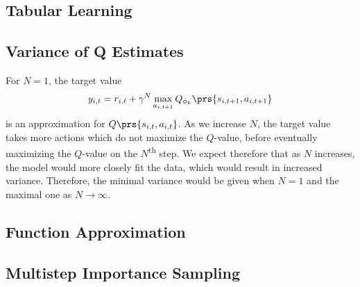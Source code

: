 \documentclass[10pt]{article}
\theoremstyle{definition}
\begin{document}
\subsection{Tabular Learning}

\subsection{Variance of Q Estimates}

For $N = 1$, the target value
\[y_{i,t} = r_{i,t} + \gamma^N \max_{a_{i, t+1}} Q_{\phi_k}\prs{s_{i,t+1}, a_{i,t+1}}\]
is an approximation for $Q\prs{s_{i,t}, a_{i,t}}$. As we increase $N$, the target value takes more actions which do not maximize the $Q$-value, before eventually maximizing the $Q$-value on the $N$\textsuperscript{th} step.
We expect therefore that as $N$ increases, the model would more closely fit the data, which would result in increased variance. Therefore, the minimal variance would be given when $N=1$ and the maximal one as $N \to \infty$.

\subsection{Function Approximation}

\subsection{Multistep Importance Sampling}

\printbibliography
\printindex
\end{document}
